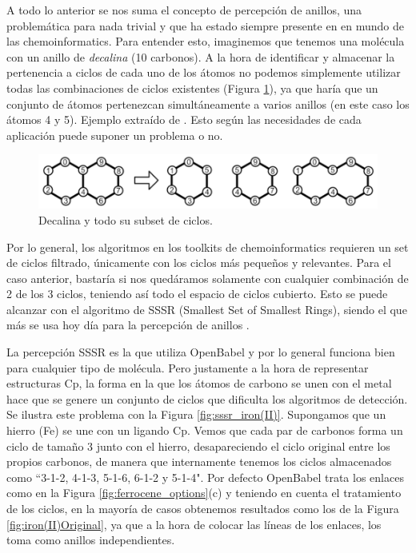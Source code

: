 A todo lo anterior se nos suma el concepto de percepción de anillos, una problemática para nada trivial y que ha estado siempre presente en en mundo de las chemoinformatics. Para entender esto, imaginemos que tenemos una molécula con un anillo de \textit{decalina} (10 carbonos). A la hora de identificar y almacenar la pertenencia a ciclos de cada uno de los átomos no podemos simplemente utilizar todas las combinaciones de ciclos existentes (Figura \ref{fig:decalina_all_ciclos}), ya que haría que un conjunto de átomos pertenezcan simultáneamente a varios anillos (en este caso los átomos 4 y 5). Ejemplo extraído de \cite{sssr_smallest_2020}. Esto según las necesidades de cada aplicación puede suponer un problema o no.

\begin{figure}[h!]
    \centering
    \includegraphics[scale=0.5]{imagenes/diseno/dibujo/decalina_all_cycles.png}
    \caption{Decalina y todo su subset de ciclos.}
    \label{fig:decalina_all_ciclos}
\end{figure}

Por lo general, los algoritmos en los toolkits de chemoinformatics requieren un set de ciclos filtrado, únicamente con los ciclos más pequeños y relevantes. Para el caso anterior, bastaría si nos quedáramos solamente con cualquier combinación de 2 de los 3 ciclos, teniendo así todo el espacio de ciclos cubierto. Esto se puede alcanzar con el algoritmo de SSSR (Smallest Set of Smallest Rings), siendo el que más se usa hoy día para la percepción de anillos \cite{sssr_smallest_2020, sssr_harmful,sssr_counterexamples_2004, sssr_review_1989}. 

La percepción SSSR es la que utiliza OpenBabel y por lo general funciona bien para cualquier tipo de molécula. Pero justamente a la hora de representar estructuras Cp, la forma en la que los átomos de carbono se unen con el metal hace que se genere un conjunto de ciclos que dificulta los algoritmos de detección. Se ilustra este problema con la Figura \ref{fig:sssr_iron(II)}. Supongamos que un hierro (Fe) se une con un ligando Cp. Vemos que cada par de carbonos forma un ciclo de tamaño 3 junto con el hierro, desapareciendo el ciclo original entre los propios carbonos, de manera que internamente tenemos los ciclos almacenados como ``3-1-2, 4-1-3, 5-1-6, 6-1-2 y 5-1-4". Por defecto OpenBabel trata los enlaces como en la Figura \ref{fig:ferrocene_options}(c) y teniendo en cuenta el tratamiento de los ciclos, en la mayoría de casos obtenemos resultados como los de la Figura \ref{fig:iron(II)Original}, ya que a la hora de colocar las líneas de los enlaces, los toma como anillos independientes.

